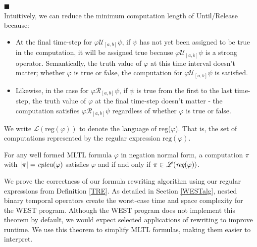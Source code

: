 \documentclass[runningheads]{llncs}
\renewcommand{\phi}{\varphi}
\begin{document}
 \vspace{-0.25in} \hfill $\blacksquare$\\
 \noindent Intuitively, we can reduce the minimum computation length of Until/Release because:
 \begin{itemize}
     \item At the final time-step for $\phi \mathcal{U}_{[a,b]} \psi$, if $\psi$ has not yet been assigned to be true in the computation, it will be assigned true because $\phi \mathcal{U}_{[a,b]} \psi$ is a strong operator. Semantically, the truth value of $\phi$ at this time interval doesn't matter; whether $\phi$ is true or false, the computation for $\phi \mathcal{U}_{[a,b]} \psi$ is satisfied.
     \item Likewise, in the case for $\phi \mathcal{R}_{[a,b]} \psi$, if $\psi$ is true from the first to the last time-step, the truth value of $\phi$ at the final time-step doesn't matter - the computation satisfies $\phi \mathcal{R}_{[a,b]} \psi$ regardless of whether $\phi$ is true or false.
 \end{itemize} %
 We write $\mathscr{L}(\text{reg}(\phi))$ to denote the language of reg($\phi$). That is, the set of computations represented by the regular expression $\text{reg}(\phi)$.
 \begin{theorem} \label{SoundComplete}
 For any well formed MLTL formula $\phi$ in negation normal form, a computation $\pi$ with $|\pi| = \emph{cplen}(\phi)$ satisfies $\phi$ and  if and only if $\pi \in \mathscr{L}(\emph{reg}(\phi))$.
 \end{theorem}
 We prove the correctness of our formula rewriting algorithm using our regular expressions from Definition \ref{TRE}. As detailed in Section \ref{WESTalg}, nested binary temporal operators create the worst-case time and space complexity for the WEST program. Although the WEST program does not implement this theorem by default, we would expect selected applications of rewriting to improve runtime. We use this theorem to simplify MLTL formulas, making them easier to interpret.
 
\end{document}

